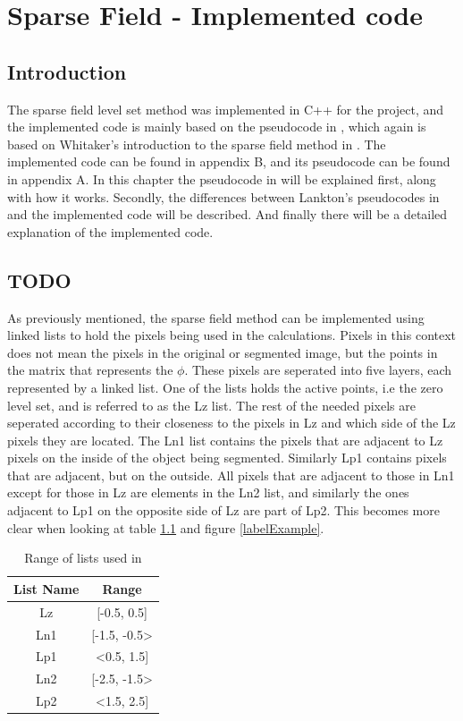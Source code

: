 \chapter{Sparse Field - Implemented code}
\section{Introduction}
The sparse field level set method was implemented in C++ for the project, and the implemented code is mainly based on the pseudocode in \cite{lankton09}, which again is based on Whitaker's introduction to the sparse field method in \cite{whitaker89}. The implemented code can be found in appendix B, and its pseudocode can be found in appendix A. In this chapter the pseudocode in \cite{lankton09} will be explained first, along with how it works. Secondly, the differences between Lankton's pseudocodes in \cite{lankton09} and the implemented code will be described. And finally there will be a detailed explanation of the implemented code.

\section{TODO}
As previously mentioned, the sparse field method can be implemented using linked lists to hold the pixels being used in the calculations. Pixels in this context does not mean the pixels in the original or segmented image, but the points in the matrix that represents the $\phi$. These pixels are seperated into five layers, each represented by a linked list. One of the lists holds the active points, i.e the zero level set, and is referred to as the Lz list. The rest of the needed pixels are seperated according to their closeness to the pixels in Lz and which side of the Lz pixels they are located. The Ln1 list contains the pixels that are adjacent to Lz pixels on the inside of the object being segmented. Similarly Lp1 contains pixels that are adjacent, but on the outside. All pixels that are adjacent to those in Ln1 except for those in Lz are elements in the Ln2 list, and similarly the ones adjacent to Lp1 on the opposite side of Lz are part of Lp2. This becomes more clear when looking at table \ref{rangeTab1} and figure \ref{labelExample}. 

\begin{table}[h] %
	\begin{tabular}{| c | c |} 
	\hline
	List Name & Range\\
	\hline
	Lz & [-0.5, 0.5]\\
	Ln1 & [-1.5, -0.5>\\
	Lp1 & <0.5, 1.5]\\
	Ln2 & [-2.5, -1.5>\\
	Lp2 & <1.5, 2.5]\\
	\hline
	\end{tabular}
	\caption{Range of lists used in \cite{lankton09}}
	\label{rangeTab1}
\end{table}

